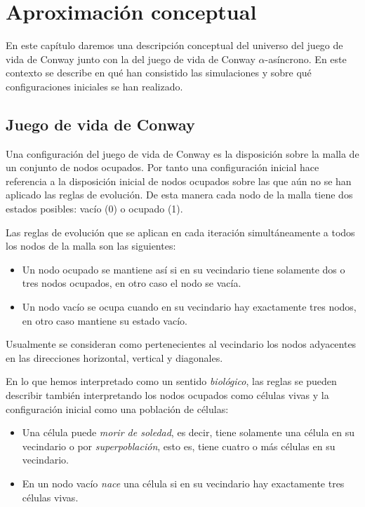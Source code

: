 \documentclass[../proyecto.tex]{memoir}
\begin{document}
\chapter{Aproximación conceptual}

En este capítulo daremos una descripción conceptual del universo del juego de vida de Conway junto con la del juego de vida de Conway $\alpha$-asíncrono. En este contexto se describe en qué han consistido las simulaciones y sobre qué configuraciones iniciales se han realizado.

\section{Juego de vida de Conway}

Una configuración del juego de vida de Conway es la disposición sobre la malla de un conjunto de nodos ocupados. Por tanto una configuración inicial hace referencia a la disposición inicial de nodos ocupados sobre las que aún no se han aplicado las reglas de evolución. De esta manera cada nodo de la malla tiene dos estados posibles: vacío (0) o  ocupado (1). 

Las reglas de evolución que se aplican en cada iteración simultáneamente a todos los nodos de la malla son las siguientes:
\begin{itemize}
\item Un nodo ocupado se mantiene así si en su vecindario tiene solamente dos o tres nodos ocupados, en otro caso el nodo se vacía.
\item Un nodo vacío se ocupa cuando en su vecindario hay exactamente tres nodos, en otro caso mantiene su estado vacío.
\end{itemize}
Usualmente se consideran como pertenecientes al vecindario los nodos adyacentes en las direcciones horizontal, vertical y diagonales. 

En lo que hemos interpretado como un sentido \textit{biológico}, las reglas se pueden describir también interpretando los nodos ocupados como células vivas y la configuración inicial como una población de células:
\begin{itemize}
\item Una célula puede \textit{morir de soledad}, es decir, tiene solamente una célula en su vecindario o por \textit{superpoblación}, esto es, tiene cuatro o más células en su vecindario.
\item En un nodo vacío \textit{nace} una célula si en su vecindario hay exactamente tres células vivas.
\end{itemize}
\end{document}
